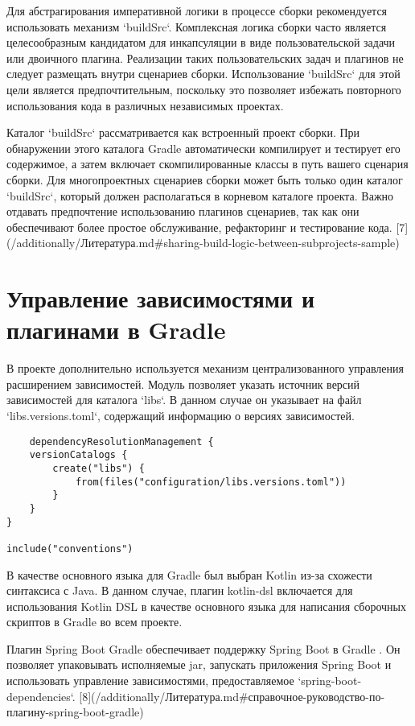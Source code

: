 Для абстрагирования императивной логики в процессе сборки рекомендуется использовать
механизм `buildSrc`. Комплексная логика сборки часто является целесообразным кандидатом для
инкапсуляции в виде пользовательской задачи или двоичного плагина. Реализации таких пользовательских
задач и плагинов не следует размещать внутри сценариев сборки. Использование `buildSrc` для этой
цели является предпочтительным, поскольку это позволяет избежать повторного использования кода в
различных независимых проектах.

Каталог `buildSrc` рассматривается как встроенный проект сборки. При обнаружении этого каталога
Gradle автоматически компилирует и тестирует его содержимое, а затем включает скомпилированные
классы в путь вашего сценария сборки. Для многопроектных сценариев сборки может быть только один
каталог `buildSrc`, который должен располагаться в корневом каталоге проекта. Важно отдавать
предпочтение использованию плагинов сценариев, так как они обеспечивают более простое обслуживание,
рефакторинг и тестирование
кода. [7](/additionally/Литература.md\#sharing-build-logic-between-subprojects-sample)


\section{Управление зависимостями и плагинами в Gradle}

В проекте дополнительно используется механизм централизованного управления расширением зависимостей.
Модуль позволяет указать источник версий зависимостей для каталога `libs`. В данном случае он
указывает на файл `libs.versions.toml`,
содержащий информацию о версиях зависимостей.

\begin{lstlisting}
    dependencyResolutionManagement {
    versionCatalogs {
        create("libs") {
            from(files("configuration/libs.versions.toml"))
        }
    }
}

include("conventions")
\end{lstlisting}


В качестве основного языка для Gradle был выбран Kotlin из-за схожести синтаксиса с Java.
В данном случае, плагин kotlin-dsl включается для использования Kotlin DSL в качестве основного
языка для написания сборочных скриптов в Gradle во всем проекте.

Плагин Spring Boot Gradle обеспечивает поддержку Spring Boot в Gradle . Он позволяет упаковывать
исполняемые jar, запускать приложения Spring Boot и использовать управление
зависимостями,
предоставляемое `spring-boot-dependencies`. [8](/additionally/Литература.md\#справочное-руководство-по-плагину-spring-boot-gradle)

